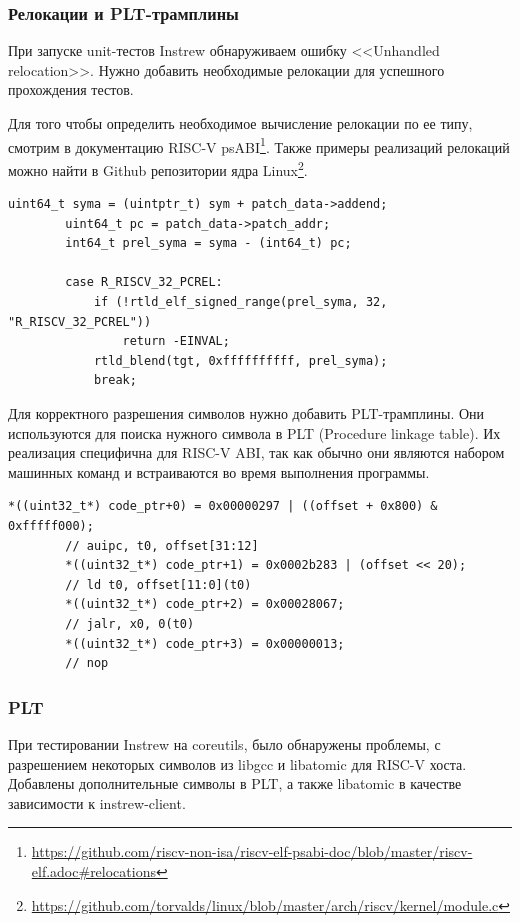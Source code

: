 \subsubsection{Релокации и PLT-трамплины}
При запуске unit-тестов Instrew обнаруживаем ошибку <<Unhandled relocation>>. Нужно добавить необходимые релокации для успешного прохождения тестов.

Для того чтобы определить необходимое вычисление релокации по ее типу, смотрим в документацию RISC-V psABI\footnote{\href{https://github.com/riscv-non-isa/riscv-elf-psabi-doc/blob/master/riscv-elf.adoc\#relocations}{https://github.com/riscv-non-isa/riscv-elf-psabi-doc/blob/master/riscv-elf.adoc\#relocations}}. Также примеры реализаций релокаций можно найти в Github репозитории ядра Linux\footnote{\href{https://github.com/torvalds/linux/blob/master/arch/riscv/kernel/module.c}{https://github.com/torvalds/linux/blob/master/arch/riscv/kernel/module.c}}.

\begin{lstlisting}[caption={Релокация}, frame=single, breaklines, basicstyle=\footnotesize]
        uint64_t syma = (uintptr_t) sym + patch_data->addend;
        uint64_t pc = patch_data->patch_addr;
        int64_t prel_syma = syma - (int64_t) pc;

        case R_RISCV_32_PCREL:
            if (!rtld_elf_signed_range(prel_syma, 32, "R_RISCV_32_PCREL"))
                return -EINVAL;
            rtld_blend(tgt, 0xffffffffff, prel_syma);
            break;
\end{lstlisting}

Для корректного разрешения символов нужно добавить PLT-трамплины. Они используются для поиска нужного символа в PLT (Procedure linkage table). Их реализация специфична для RISC-V ABI, так как обычно они являются набором машинных команд и встраиваются во время выполнения программы.

\begin{lstlisting}[caption={PLT-трамплин}, frame=single, breaklines, basicstyle=\footnotesize]
        *((uint32_t*) code_ptr+0) = 0x00000297 | ((offset + 0x800) & 0xfffff000);
        // auipc, t0, offset[31:12]
        *((uint32_t*) code_ptr+1) = 0x0002b283 | (offset << 20); 
        // ld t0, offset[11:0](t0)
        *((uint32_t*) code_ptr+2) = 0x00028067;
        // jalr, x0, 0(t0)
        *((uint32_t*) code_ptr+3) = 0x00000013;
        // nop
\end{lstlisting}

\subsubsection{PLT}
При тестировании Instrew на coreutils, было обнаружены проблемы, с разрешением некоторых символов из libgcc и libatomic для RISC-V хоста. Добавлены дополнительные символы в PLT, а также libatomic в качестве зависимости к instrew-client.


